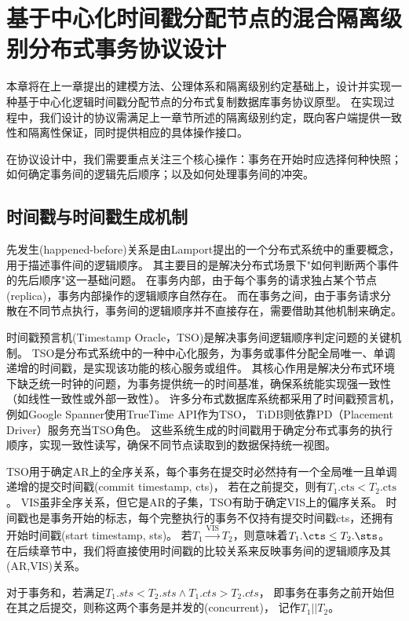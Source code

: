 \chapter{基于中心化时间戳分配节点的混合隔离级别分布式事务协议设计}

本章将在上一章提出的建模方法、公理体系和隔离级别约定基础上，设计并实现一种基于中心化逻辑时间戳分配节点的分布式复制数据库事务协议原型。
在实现过程中，我们设计的协议需满足上一章节所述的隔离级别约定，既向客户端提供一致性和隔离性保证，同时提供相应的具体操作接口。

在协议设计中，我们需要重点关注三个核心操作：事务在开始时应选择何种快照；如何确定事务间的逻辑先后顺序；以及如何处理事务间的冲突。

\section{时间戳与时间戳生成机制}

先发生(happened-before)关系是由Lamport\cite{happened-before}提出的一个分布式系统中的重要概念，用于描述事件间的逻辑顺序。
其主要目的是解决分布式场景下"如何判断两个事件的先后顺序"这一基础问题。
在事务内部，由于每个事务的请求独占某个节点(replica)，事务内部操作的逻辑顺序自然存在。
而在事务之间，由于事务请求分散在不同节点执行，事务间的逻辑顺序并不直接存在，需要借助其他机制来确定。

时间戳预言机(Timestamp Oracle，TSO)\cite{tso1}是解决事务间逻辑顺序判定问题的关键机制。
TSO是分布式系统中的一种中心化服务，为事务或事件分配全局唯一、单调递增的时间戳，是实现该功能的核心服务或组件。
其核心作用是解决分布式环境下缺乏统一时钟的问题，为事务提供统一的时间基准，确保系统能实现强一致性（如线性一致性或外部一致性）。
许多分布式数据库系统都采用了时间戳预言机，
例如Google Spanner使用TrueTime API作为TSO\cite{spanner}，
TiDB则依靠PD（Placement Driver）服务充当TSO角色\cite{TiDB}。
这些系统生成的时间戳用于确定分布式事务的执行顺序，实现一致性读写，确保不同节点读取到的数据保持统一视图。

TSO用于确定AR上的全序关系，每个事务在提交时必然持有一个全局唯一且单调递增的提交时间戳(commit timestamp, cts)，
若\Txc[1]在\Txc[2]之前提交，则有$T_1.\text{cts} < T_2.\text{cts}$。
VIS虽非全序关系，但它是AR的子集，TSO有助于确定VIS上的偏序关系。
时间戳也是事务开始的标志，每个完整执行的事务不仅持有提交时间戳cts，还拥有开始时间戳(start timestamp, sts)。
若$T_1 \xrightarrow{\text{VIS}} T_2$，则意味着$ T_1.\cts \leq T_2.\sts$。
在后续章节中，我们将直接使用时间戳的比较关系来反映事务间的逻辑顺序及其(AR,VIS)关系。

对于事务\Txc[1]和\Txc[2]，若满足$T_1.sts < T_2.sts  \wedge T_1.cts > T_2.cts$，
即事务\Txc[1]在事务\Txc[2]之前开始但在其之后提交，则称这两个事务是并发的(concurrent)，
记作$T_1 || T_2$。

